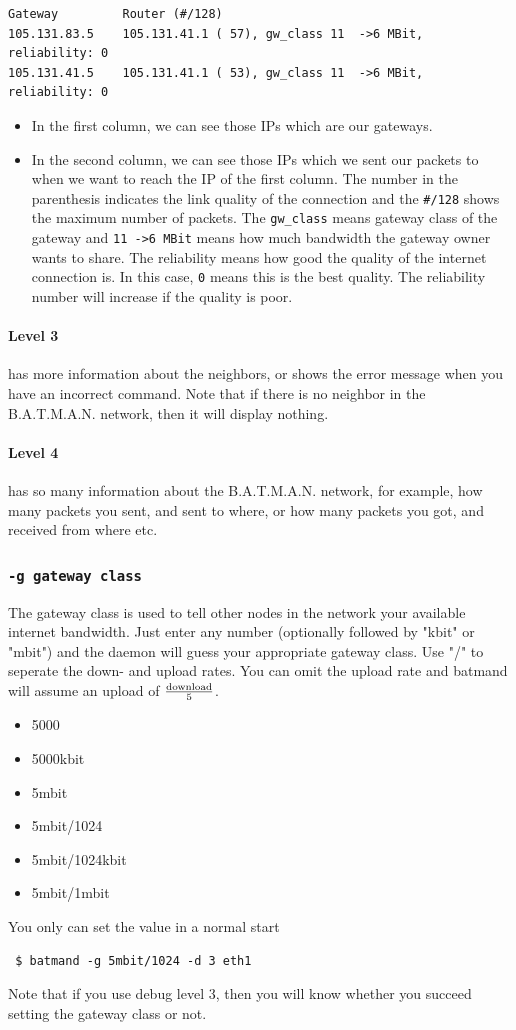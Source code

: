 \documentclass[
	12pt,
	a4paper,
	twoside,
	english,
	headsepline,
	footnosepline,
	automark,
	normalheadings,
	openany,
	cleardoubleplain,
	abstracton,
	idxtotoc,
	liststotoc,
	bibtotoc,
 	BCOR8mm,
]{scrartcl}
\newcommand{\subsubsectionttt}[1]{\subsubsection{\texttt{#1}}}
\begin{document}
\begin{lstlisting}[basicstyle=\footnotesize,	frame=single, columns= flexible]
Gateway         Router (#/128)
105.131.83.5    105.131.41.1 ( 57), gw_class 11  ->6 MBit, reliability: 0
105.131.41.5    105.131.41.1 ( 53), gw_class 11  ->6 MBit, reliability: 0
\end{lstlisting}

\begin{itemize}
\item In the first column, we can see those IPs which are our gateways.
\item In the second column, we can see those IPs which we sent our packets to
      when we want to reach the IP of the first column. The number in the
      parenthesis indicates the link quality of the connection and the
      \verb|#/128| shows the maximum number of packets. The \verb|gw_class|
      means gateway class of the gateway and \verb|11 ->6 MBit| means how much
      bandwidth the gateway owner wants to share. The reliability means how good
      the quality of the internet connection is. In this case, \verb|0| means
      this is the best quality. The reliability number will increase if the
      quality is poor.
\end{itemize}

\paragraph*{Level 3}
has more information about the neighbors, or shows the error message when you
have an incorrect command. Note that if there is no neighbor in the B.A.T.M.A.N.
network, then it will display nothing.

\paragraph*{Level 4}
has so many information about the B.A.T.M.A.N. network, for example, how many
packets you sent, and sent to where, or how many packets you got, and received
from where etc.

\subsubsectionttt{-g gateway class}
The gateway class is used to tell other nodes in the network your available
internet bandwidth. Just enter any number (optionally followed by "kbit" or
"mbit") and the daemon will guess your appropriate gateway class. Use "/" to
seperate the down- and upload rates. You can omit the upload rate and batmand
will assume an upload of $\mathrm{download}\over{5}$.

\begin{itemize}
\item 5000
\item 5000kbit
\item 5mbit
\item 5mbit/1024
\item 5mbit/1024kbit
\item 5mbit/1mbit
\end{itemize}
You only can set the value in a normal start
\begin{verbatim}
 $ batmand -g 5mbit/1024 -d 3 eth1
\end{verbatim}
Note that if you use debug level 3, then you will know whether you succeed
setting the gateway class or not.
\end{document}
